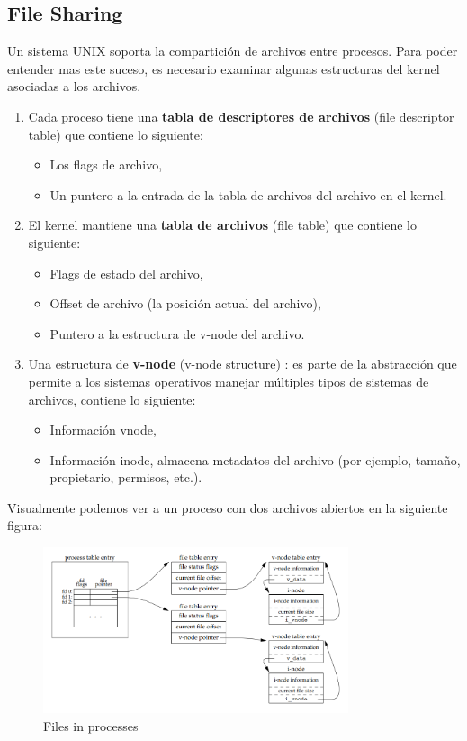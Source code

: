 \documentclass{article}
\begin{document}
\subsection{File Sharing}
Un sistema UNIX soporta la compartición de archivos entre procesos. Para poder entender mas este suceso, es necesario examinar algunas estructuras del kernel asociadas a los archivos.
\begin{enumerate}
    \item Cada proceso tiene una \textbf{tabla de descriptores de archivos} (file descriptor table) que contiene lo siguiente:
    \begin{itemize}
        \item Los flags de archivo,
        \item Un puntero a la entrada de la tabla de archivos del archivo en el kernel.
    \end{itemize}
    \item El kernel mantiene una \textbf{tabla de archivos} (file table) que contiene lo siguiente:
    \begin{itemize}
        \item Flags de estado del archivo,
        \item Offset de archivo (la posición actual del archivo),
        \item Puntero a la estructura de v-node del archivo.
    \end{itemize}
    \item Una estructura de \textbf{v-node} (v-node structure) : es parte de la abstracción que permite a los sistemas operativos manejar múltiples tipos de sistemas de archivos, contiene lo siguiente:
    \begin{itemize}
        \item Información vnode,
        \item Información inode, almacena metadatos del archivo (por ejemplo, tamaño, propietario, permisos, etc.).
    \end{itemize}
\end{enumerate}

Visualmente podemos ver a un proceso con dos archivos abiertos en la siguiente figura:

\begin{figure}[h]
    \centering
    \includegraphics[width=0.8\textwidth]{src/filesharing.png}
    \caption{Files in processes}
\end{figure}
\end{document}
